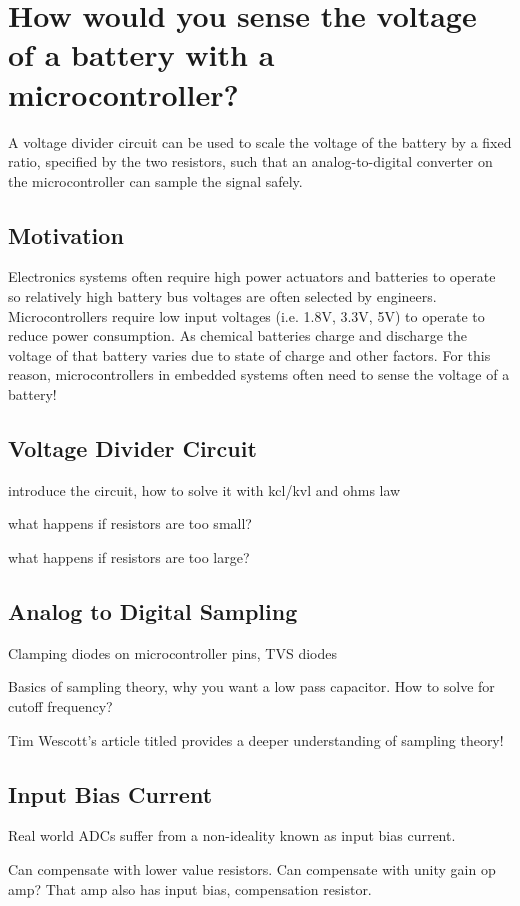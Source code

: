 \documentclass[main.tex]{subfiles}
\begin{document}
\section{How would you sense the voltage of a battery with a microcontroller?}

\noindent A voltage divider circuit can be used to scale the voltage of the battery by a fixed ratio, specified by the two resistors, such that an analog-to-digital converter on the microcontroller can sample the signal safely.

\subsection{Motivation}
Electronics systems often require high power actuators and batteries to operate so relatively high battery bus voltages are often selected by engineers. Microcontrollers require low input voltages (i.e. 1.8V, 3.3V, 5V) to operate to reduce power consumption. As chemical batteries charge and discharge the voltage of that battery varies due to state of charge and other factors. For this reason, microcontrollers in embedded systems often need to sense the voltage of a battery!

\subsection{Voltage Divider Circuit}
introduce the circuit, how to solve it with kcl/kvl and ohms law 

what happens if resistors are too small? 

what happens if resistors are too large?

\subsection{Analog to Digital Sampling}
Clamping diodes on microcontroller pins, TVS diodes 

Basics of sampling theory, why you want a low pass capacitor. How to solve for cutoff frequency? 

Tim Wescott's article titled  provides a deeper understanding of sampling theory! 

\subsection{Input Bias Current}
Real world ADCs suffer from a non-ideality known as input bias current. 

Can compensate with lower value resistors.
Can compensate with unity gain op amp? That amp also has input bias, compensation resistor. 
\end{document}
